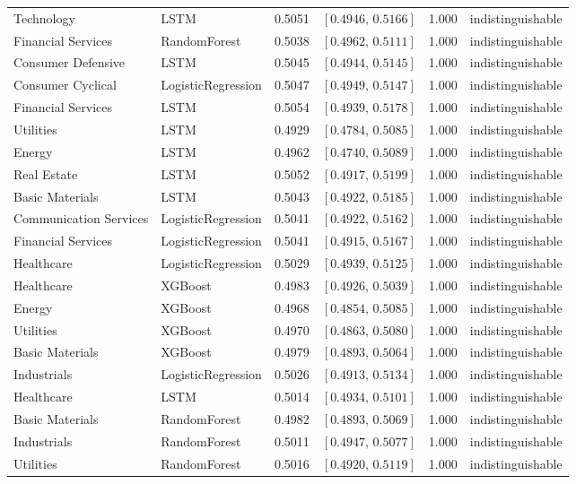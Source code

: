 \begin{longtable}{llrrrl}
Technology & LSTM & 0.5051 & $[0.4946,\,0.5166]$ & 1.000 & indistinguishable \\
Financial Services & RandomForest & 0.5038 & $[0.4962,\,0.5111]$ & 1.000 & indistinguishable \\
Consumer Defensive & LSTM & 0.5045 & $[0.4944,\,0.5145]$ & 1.000 & indistinguishable \\
Consumer Cyclical & LogisticRegression & 0.5047 & $[0.4949,\,0.5147]$ & 1.000 & indistinguishable \\
Financial Services & LSTM & 0.5054 & $[0.4939,\,0.5178]$ & 1.000 & indistinguishable \\
Utilities & LSTM & 0.4929 & $[0.4784,\,0.5085]$ & 1.000 & indistinguishable \\
Energy & LSTM & 0.4962 & $[0.4740,\,0.5089]$ & 1.000 & indistinguishable \\
Real Estate & LSTM & 0.5052 & $[0.4917,\,0.5199]$ & 1.000 & indistinguishable \\
Basic Materials & LSTM & 0.5043 & $[0.4922,\,0.5185]$ & 1.000 & indistinguishable \\
Communication Services & LogisticRegression & 0.5041 & $[0.4922,\,0.5162]$ & 1.000 & indistinguishable \\
Financial Services & LogisticRegression & 0.5041 & $[0.4915,\,0.5167]$ & 1.000 & indistinguishable \\
Healthcare & LogisticRegression & 0.5029 & $[0.4939,\,0.5125]$ & 1.000 & indistinguishable \\
Healthcare & XGBoost & 0.4983 & $[0.4926,\,0.5039]$ & 1.000 & indistinguishable \\
Energy & XGBoost & 0.4968 & $[0.4854,\,0.5085]$ & 1.000 & indistinguishable \\
Utilities & XGBoost & 0.4970 & $[0.4863,\,0.5080]$ & 1.000 & indistinguishable \\
Basic Materials & XGBoost & 0.4979 & $[0.4893,\,0.5064]$ & 1.000 & indistinguishable \\
Industrials & LogisticRegression & 0.5026 & $[0.4913,\,0.5134]$ & 1.000 & indistinguishable \\
Healthcare & LSTM & 0.5014 & $[0.4934,\,0.5101]$ & 1.000 & indistinguishable \\
Basic Materials & RandomForest & 0.4982 & $[0.4893,\,0.5069]$ & 1.000 & indistinguishable \\
Industrials & RandomForest & 0.5011 & $[0.4947,\,0.5077]$ & 1.000 & indistinguishable \\
Utilities & RandomForest & 0.5016 & $[0.4920,\,0.5119]$ & 1.000 & indistinguishable \\

\end{longtable}
